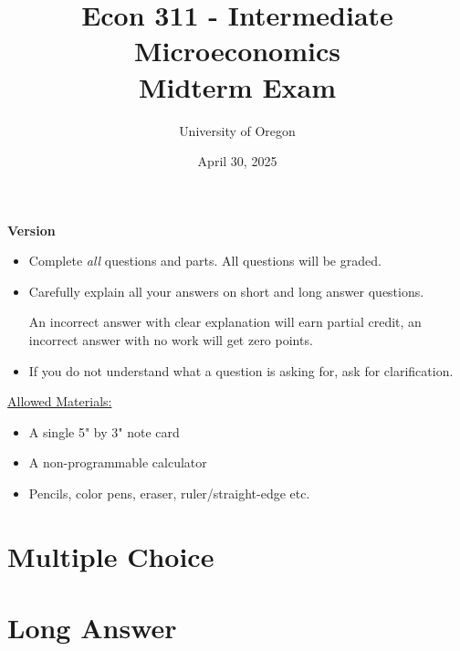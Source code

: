 \documentclass{article}
\title{
    \textbf{Econ 311 - Intermediate Microeconomics} \\ 
    Midterm Exam
    }
\author{University of Oregon}
\date{April 30, 2025}
\begin{document}
\maketitle


\begin{center}
  \Large{\textbf{Version }}
\end{center}

\begin{itemize}
  \item Complete \textit{all} questions and parts. 
  All questions will be graded.
  \item Carefully explain all your answers on short and long answer questions.

  An incorrect answer with clear explanation will earn partial credit,
  an incorrect answer with no work will get zero points.

  \item 
  If you do not understand what a question is asking for, 
  ask for clarification. 
\end{itemize}

\underline{Allowed Materials:}

\begin{itemize}
  \item A single 5" by 3" note card
  \item A non-programmable calculator
  \item Pencils, color pens, eraser, ruler/straight-edge etc.
\end{itemize}

\vspace{1.0in}


\vspace{0.5in}

\begin{center}
\end{center}

\newpage


\section*{Multiple Choice}



\newpage

\section*{Long Answer}


\newpage


\newpage


\end{document}
